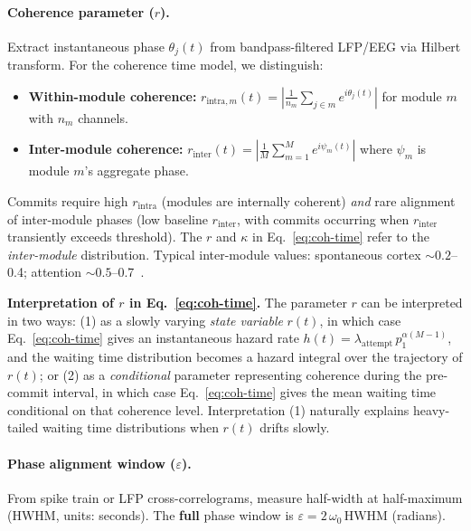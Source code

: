 \documentclass[12pt]{article}
\begin{document}
\paragraph{Coherence parameter ($r$).} Extract instantaneous phase $\theta_j(t)$ from bandpass-filtered LFP/EEG via Hilbert transform. For the coherence time model, we distinguish:
\begin{itemize}
\item \textbf{Within-module coherence:} $r_{\mathrm{intra},m}(t) = \left|\frac{1}{n_m}\sum_{j \in m} e^{i\theta_j(t)}\right|$ for module $m$ with $n_m$ channels.
\item \textbf{Inter-module coherence:} $r_{\mathrm{inter}}(t) = \left|\frac{1}{M}\sum_{m=1}^M e^{i\psi_m(t)}\right|$ where $\psi_m$ is module $m$'s aggregate phase.
\end{itemize}
Commits require high $r_{\mathrm{intra}}$ (modules are internally coherent) \emph{and} rare alignment of inter-module phases (low baseline $r_{\mathrm{inter}}$, with commits occurring when $r_{\mathrm{inter}}$ transiently exceeds threshold). The $r$ and $\kappa$ in Eq.~\ref{eq:coh-time} refer to the \emph{inter-module} distribution. Typical inter-module values: spontaneous cortex $\sim 0.2$--0.4; attention $\sim 0.5$--0.7~\cite{fries2015,womelsdorf2007}.

\textbf{Interpretation of $r$ in Eq.~\ref{eq:coh-time}.} The parameter $r$ can be interpreted in two ways: (1) as a slowly varying \emph{state variable} $r(t)$, in which case Eq.~\ref{eq:coh-time} gives an instantaneous hazard rate $h(t) = \lambda_{\mathrm{attempt}}\, p_1^{\alpha(M-1)}$, and the waiting time distribution becomes a hazard integral over the trajectory of $r(t)$; or (2) as a \emph{conditional} parameter representing coherence during the pre-commit interval, in which case Eq.~\ref{eq:coh-time} gives the mean waiting time conditional on that coherence level. Interpretation (1) naturally explains heavy-tailed waiting time distributions when $r(t)$ drifts slowly.

\paragraph{Phase alignment window ($\varepsilon$).} From spike train or LFP cross-correlograms, measure half-width at half-maximum (HWHM, units: seconds). The \textbf{full} phase window is $\varepsilon = 2\,\omega_0\,\mathrm{HWHM}$ (radians).
\end{document}
